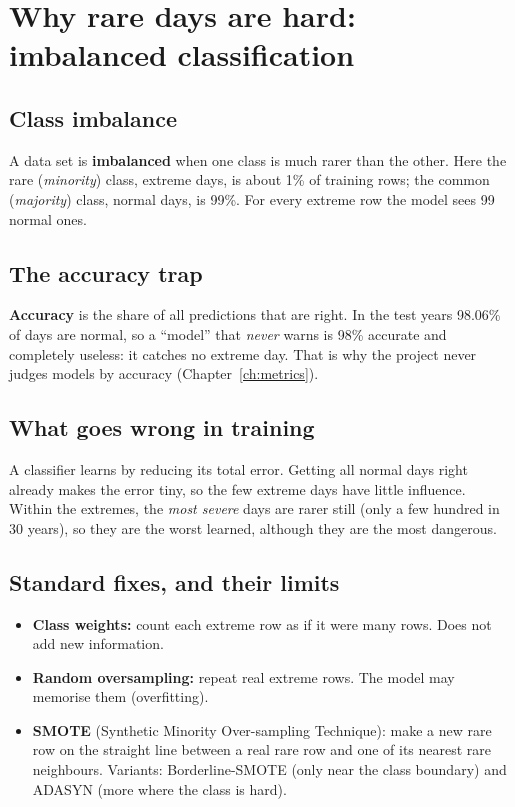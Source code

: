 \chapter{Why rare days are hard: imbalanced classification}
\label{ch:imb}

\section{Class imbalance}
A data set is \textbf{imbalanced} when one class is much rarer than the other. Here the rare (\emph{minority}) class,
extreme days, is about 1\% of training rows; the common (\emph{majority}) class, normal days, is 99\%. For every
extreme row the model sees 99 normal ones.

\section{The accuracy trap}
\textbf{Accuracy} is the share of all predictions that are right. In the test years 98.06\% of days are normal, so a
``model'' that \emph{never} warns is 98\% accurate and completely useless: it catches no extreme day. That is why the
project never judges models by accuracy (Chapter~\ref{ch:metrics}).

\section{What goes wrong in training}
A classifier learns by reducing its total error. Getting all normal days right already makes the error tiny, so the
few extreme days have little influence. Within the extremes, the \emph{most severe} days are rarer still (only a few
hundred in 30 years), so they are the worst learned, although they are the most dangerous.

\section{Standard fixes, and their limits}
\begin{itemize}
  \item \textbf{Class weights:} count each extreme row as if it were many rows. Does not add new information.
  \item \textbf{Random oversampling:} repeat real extreme rows. The model may memorise them (overfitting).
  \item \textbf{SMOTE} (Synthetic Minority Over-sampling Technique): make a new rare row on the straight line between
        a real rare row and one of its nearest rare neighbours. Variants: Borderline-SMOTE (only near the class
        boundary) and ADASYN (more where the class is hard).
\end{itemize}

